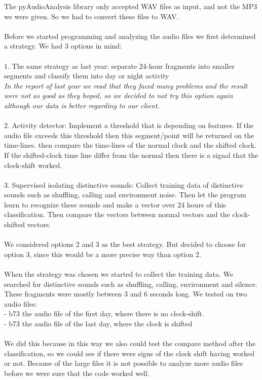 \documentclass[a4paper]{article}
\begin{document}
The pyAudioAnalysis library only accepted WAV files as input, and not the MP3 we were given. So we had to convert these files to WAV.\\\\
Before we started programming and analyzing the audio files we first determined a strategy. We had 3 options in mind:\\\\
1. The same strategy as last year: separate 24-hour fragments into smaller segments and classify them into day or night activity\\
\emph{In the report of last year we read that they faced many problems and the result were not as good as they hoped, so we decided to not try this option again although our data is better regarding to our client.}\\\\
2. Activity detector: Implement a threshold that is depending on features. If the audio file exceeds this threshold then this segment/point will be returned on the time-lines. then compare the time-lines of the normal clock and the shifted clock. If the shifted-clock time line differ from the normal then there is a signal that the clock-shift worked.\\\\
3. Supervised isolating distinctive sounds: Collect training data of distinctive sounds such as shuffling, calling and environment noise. Then let the program learn to recognize these sounds and make a vector over 24 hours of this classification. Then compare the vectors between normal vectors and the clock-shifted vectors. \\\\
We considered options 2 and 3 as the best strategy. But decided to choose for option 3, since this would be a more precise way than option 2. \\\\
When the strategy was chosen we started to collect the training data. We searched for distinctive sounds such as shuffling, calling, environment and silence. These fragments were mostly between 3 and  6 seconds long. We tested on two audio files:\\
- b73 the audio file of the first day, where there is no clock-shift. \\
- b73 the audio file of the last day, where the clock is shifted\\\\
We did this because in this way we also could test the compare method after the classification, so we could see if there were signs of the clock shift having worked or not. Because of the large files it is not possible to analyze more audio files before we were sure that the code worked well.\\\\
\end{document}
